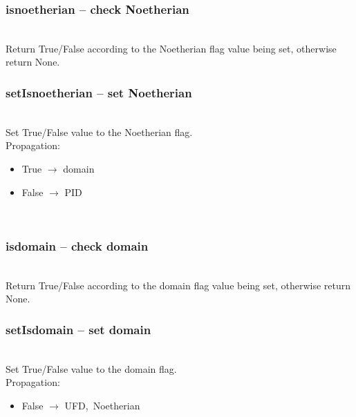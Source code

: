   \subsubsection{isnoetherian -- check Noetherian}
   \\
   \spacing
   \quad Return True/False according to the Noetherian flag value being set,
        otherwise return None.\\
   \spacing
  \subsubsection{setIsnoetherian -- set Noetherian}
   \\
   \spacing
   \quad Set True/False value to the Noetherian flag.\\
   Propagation:
   \begin{itemize}
    \item True $\to$ domain\\
    \item False $\to$ PID\\
   \end{itemize}
   \quad\\
   \spacing
  \subsubsection{isdomain -- check domain}
   \\
   \spacing
   \quad Return True/False according to the domain flag value being set,
        otherwise return None.\\
   \spacing
  \subsubsection{setIsdomain -- set domain}
   \\
   \spacing
   \quad Set True/False value to the domain flag.\\
   Propagation:
   \begin{itemize}
    \item False $\to$ UFD,\ Noetherian\\
   \end{itemize}
   \quad\\
   \spacing
\C

